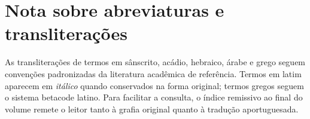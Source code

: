 \chapter*{Nota sobre abreviaturas e transliterações}

As transliterações de termos em sânscrito, acádio, hebraico, árabe e
grego seguem convenções padronizadas da literatura acadêmica de
referência. Termos em latim aparecem em \textit{itálico} quando
conservados na forma original; termos gregos seguem o sistema
betacode latino. Para facilitar a consulta, o índice remissivo ao
final do volume remete o leitor tanto à grafia original quanto à
tradução aportuguesada.
\clearpage
